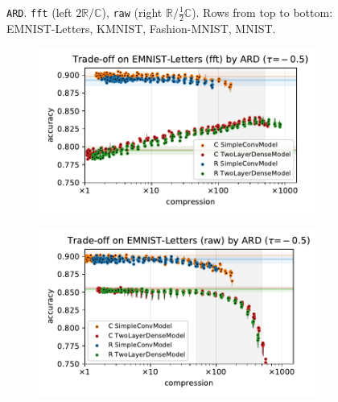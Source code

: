 \documentclass[a4paper,10pt,onecolumn]{article}
\newcommand{\real}{\mathbb{R}}
\newcommand{\cplx}{\mathbb{C}}
\begin{document}
\begin{figure}[b]
\begin{subfigure}[b]{0.5\columnwidth}
  \end{subfigure}
  \caption{%
    \texttt{ARD}.
      \texttt{fft} (left $2\real / \cplx$), \texttt{raw} (right $\real / \tfrac12\cplx$).
      Rows from top to bottom: EMNIST-Letters, KMNIST, Fashion-MNIST, MNIST.
  }
\end{figure}

\begin{figure}[b]
  \centering
  \begin{subfigure}[b]{0.5\columnwidth}
    \centering
    \includegraphics[width=\columnwidth]{figure__mnist-like__trade-off/appendix__ARD__emnist_letters__fft__-0.5.pdf}
  \end{subfigure}%
  \begin{subfigure}[b]{0.5\columnwidth}
    \centering
    \includegraphics[width=\columnwidth]{figure__mnist-like__trade-off/appendix__ARD__emnist_letters__raw__-0.5.pdf}
  \end{subfigure} \\ %

\end{figure}
\end{document}
